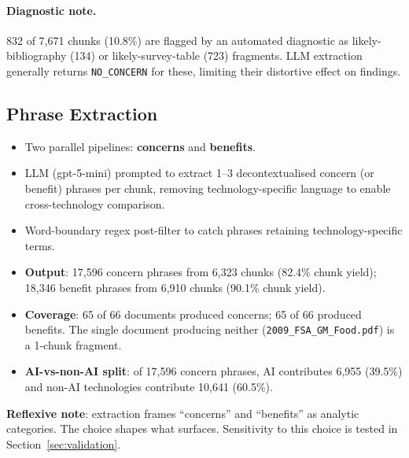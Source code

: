 \documentclass[11pt, a4paper]{article}
\begin{document}
\paragraph{Diagnostic note.}  832 of 7,671 chunks (10.8\%) are flagged
by an automated diagnostic as likely-bibliography (134) or
likely-survey-table (723) fragments.  LLM extraction generally returns
\texttt{NO\_CONCERN} for these, limiting their distortive effect on
findings.

\subsection{Phrase Extraction}

\begin{itemize}
\item Two parallel pipelines: \textbf{concerns} and \textbf{benefits}.
\item LLM (gpt-5-mini) prompted to extract 1--3 decontextualised concern
      (or benefit) phrases per chunk, removing technology-specific
      language to enable cross-technology comparison.
\item Word-boundary regex post-filter to catch phrases retaining
      technology-specific terms.
\item \textbf{Output}: 17,596 concern phrases from 6,323 chunks (82.4\%
      chunk yield); 18,346 benefit phrases from 6,910 chunks (90.1\%
      chunk yield).
\item \textbf{Coverage}: 65 of 66 documents produced concerns; 65 of 66
      produced benefits.  The single document producing neither
      (\texttt{2009\_FSA\_GM\_Food.pdf}) is a 1-chunk fragment.
\item \textbf{AI-vs-non-AI split}: of 17,596 concern phrases, AI
      contributes 6,955 (39.5\%) and non-AI technologies contribute
      10,641 (60.5\%).
\end{itemize}

\noindent\textbf{Reflexive note}: extraction frames ``concerns'' and
``benefits'' as analytic categories.  The choice shapes what surfaces.
Sensitivity to this choice is tested in Section~\ref{sec:validation}.
\end{document}
